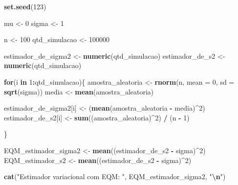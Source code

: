\documentclass[
]{article}
\newenvironment{Shaded}{\begin{snugshade}}{\end{snugshade}}
\newcommand{\AttributeTok}[1]{\textcolor[rgb]{0.13,0.29,0.53}{#1}}
\newcommand{\ControlFlowTok}[1]{\textcolor[rgb]{0.13,0.29,0.53}{\textbf{#1}}}
\newcommand{\DecValTok}[1]{\textcolor[rgb]{0.00,0.00,0.81}{#1}}
\newcommand{\FunctionTok}[1]{\textcolor[rgb]{0.13,0.29,0.53}{\textbf{#1}}}
\newcommand{\NormalTok}[1]{#1}
\newcommand{\OtherTok}[1]{\textcolor[rgb]{0.56,0.35,0.01}{#1}}
\newcommand{\SpecialCharTok}[1]{\textcolor[rgb]{0.81,0.36,0.00}{\textbf{#1}}}
\newcommand{\StringTok}[1]{\textcolor[rgb]{0.31,0.60,0.02}{#1}}
\begin{document}
\begin{Shaded}
\begin{Highlighting}[]
\FunctionTok{set.seed}\NormalTok{(}\DecValTok{123}\NormalTok{)}

\NormalTok{mu }\OtherTok{\textless{}{-}} \DecValTok{0}
\NormalTok{sigma }\OtherTok{\textless{}{-}} \DecValTok{1} 

\NormalTok{n }\OtherTok{\textless{}{-}} \DecValTok{100}
\NormalTok{qtd\_simulacao }\OtherTok{\textless{}{-}} \DecValTok{100000}

\NormalTok{estimador\_de\_sigma2 }\OtherTok{\textless{}{-}} \FunctionTok{numeric}\NormalTok{(qtd\_simulacao)}
\NormalTok{estimador\_de\_s2 }\OtherTok{\textless{}{-}} \FunctionTok{numeric}\NormalTok{(qtd\_simulacao)}

\ControlFlowTok{for}\NormalTok{(i }\ControlFlowTok{in} \DecValTok{1}\SpecialCharTok{:}\NormalTok{qtd\_simulacao)\{}
\NormalTok{    amostra\_aleatoria }\OtherTok{\textless{}{-}} \FunctionTok{rnorm}\NormalTok{(n, }\AttributeTok{mean =} \DecValTok{0}\NormalTok{, }\AttributeTok{sd =} \FunctionTok{sqrt}\NormalTok{(sigma)) }
\NormalTok{    media }\OtherTok{\textless{}{-}} \FunctionTok{mean}\NormalTok{(amostra\_aleatoria)}
    

\NormalTok{    estimador\_de\_sigma2[i] }\OtherTok{\textless{}{-}}\NormalTok{ (}\FunctionTok{mean}\NormalTok{(amostra\_aleatoria }\SpecialCharTok{{-}}\NormalTok{ media)}\SpecialCharTok{\^{}}\DecValTok{2}\NormalTok{)}
\NormalTok{    estimador\_de\_s2[i] }\OtherTok{\textless{}{-}} \FunctionTok{sum}\NormalTok{((amostra\_aleatoria)}\SpecialCharTok{\^{}}\DecValTok{2}\NormalTok{) }\SpecialCharTok{/}\NormalTok{ (n }\SpecialCharTok{{-}} \DecValTok{1}\NormalTok{)}

\NormalTok{\}}




\NormalTok{EQM\_estimador\_sigma2 }\OtherTok{\textless{}{-}} \FunctionTok{mean}\NormalTok{((estimador\_de\_s2 }\SpecialCharTok{{-}}\NormalTok{ sigma)}\SpecialCharTok{\^{}}\DecValTok{2}\NormalTok{)}
\NormalTok{EQM\_estimador\_s2 }\OtherTok{\textless{}{-}} \FunctionTok{mean}\NormalTok{((estimador\_de\_s2 }\SpecialCharTok{{-}}\NormalTok{ sigma)}\SpecialCharTok{\^{}}\DecValTok{2}\NormalTok{)}

\FunctionTok{cat}\NormalTok{(}\StringTok{"Estimador variacional com EQM: "}\NormalTok{, EQM\_estimador\_sigma2, }\StringTok{"}\SpecialCharTok{\textbackslash{}n}\StringTok{"}\NormalTok{)}
\end{Highlighting}
\end{Shaded}
\end{document}
